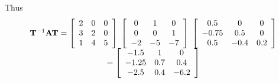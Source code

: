 Thus
\[
\begin{array}{c}
 {\bf{T}}^{ - 1} {\bf{AT}} = \left[ {\begin{array}{*{20}c}
   2 & 0 & 0  \\
   3 & 2 & 0  \\
   1 & 4 & 5  \\
\end{array}} \right]\;\left[ {\begin{array}{*{20}c}
   0 & 1 & 0  \\
   0 & 0 & 1  \\
   { - 2} & { - 5} & { - 7}  \\
\end{array}} \right]\;\left[ {\begin{array}{*{20}c}
   {0.5} & 0 & 0  \\
   { - 0.75} & {0.5} & 0  \\
   {0.5} & { - 0.4} & {0.2}  \\
\end{array}} \right] \\ 
  = \left[ {\begin{array}{*{20}c}
   { - 1.5} & 1 & 0  \\
   { - 1.25} & {0.7} & {0.4}  \\
   { - 2.5} & {0.4} & { - 6.2}  \\
\end{array}} \right] \\ 
 \end{array}
\]

